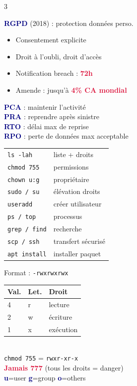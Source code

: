 \documentclass[a4paper,9pt]{article}
\newcommand{\key}[1]{\textbf{\textcolor{navy}{#1}}}
\newcommand{\warn}[1]{\textbf{\textcolor{crimson}{#1}}}
\begin{document}
\begin{multicols}{3}
\begin{tcolorbox}[basebox, colframe=crimson, title=CYBERSÉCURITÉ — RGPD \& PCA]
\key{RGPD} (2018) : protection données perso.
\begin{itemize}
  \item Consentement explicite
  \item Droit à l'oubli, droit d'accès
  \item Notification breach : \warn{72h}
  \item Amende : jusqu'à \warn{4\% CA mondial}
\end{itemize}
\key{PCA} : maintenir l'activité \\
\key{PRA} : reprendre après sinistre \\
\key{RTO} : délai max de reprise \\
\key{RPO} : perte de données max acceptable
\end{tcolorbox}

\begin{tcolorbox}[basebox, colframe=green, title=ADMIN LINUX — Commandes clés]
{\footnotesize
\begin{tabularx}{\columnwidth}{@{}lX@{}}
\texttt{ls -lah} & liste + droits \\
\texttt{chmod 755} & permissions \\
\texttt{chown u:g} & propriétaire \\
\texttt{sudo / su} & élévation droits \\
\texttt{useradd} & créer utilisateur \\
\texttt{ps / top} & processus \\
\texttt{grep / find} & recherche \\
\texttt{scp / ssh} & transfert sécurisé \\
\texttt{apt install} & installer paquet \\
\end{tabularx}}
\end{tcolorbox}

\begin{tcolorbox}[basebox, colframe=green, title=ADMIN LINUX — Permissions]
Format : \texttt{-rwxrwxrwx} \\[1pt]
{\footnotesize
\begin{tabular}{@{}lll@{}}
\textbf{Val.} & \textbf{Let.} & \textbf{Droit} \\
\hline
4 & r & lecture \\
2 & w & écriture \\
1 & x & exécution \\
\end{tabular}}
\vspace{2pt} \\
\texttt{chmod 755} = \texttt{rwxr-xr-x} \\
\warn{Jamais 777} (tous les droits = danger) \\
\key{u}=user \key{g}=group \key{o}=others
\end{tcolorbox}


\end{multicols}
\end{document}
